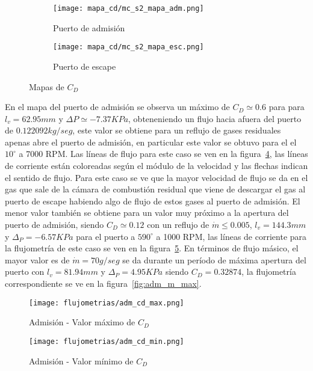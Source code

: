 \begin{figure}[ht!]
    \centering
    \begin{subfigure}{0.7\textwidth}
        \centering
        \texttt{[image: mapa\_cd/mc\_s2\_mapa\_adm.png]}
        \caption{Puerto de admisión}\label{fig:mapa_cd_admisión}
    \end{subfigure}
    \hfill
    \begin{subfigure}{0.7\textwidth}
        \centering
        \texttt{[image: mapa\_cd/mc\_s2\_mapa\_esc.png]}
        \caption{Puerto de escape}\label{fig:mapa_cd_escape}
    \end{subfigure}
    \caption{Mapas de $C_{D}$}\label{fig:mapa_cd_mc_s2}
\end{figure}

En el mapa del puerto de admisión se observa un máximo de $C_{D}\simeq 0.6$ para
para $l_{v}=62.95 mm$ y $\Delta P\simeq -7.37 KPa$, obteneniendo un flujo hacia
afuera del puerto de $0.122092 kg/seg$, este valor se obtiene para un
reflujo de gases residuales apenas abre el puerto de admisión, en particular
este valor se obtuvo para el el $10^{\circ}$ a 7000 RPM.
%
Las líneas de flujo para este caso se ven en la figura~\ref{fig:adm_cd_max}, las
líneas de corriente están coloreadas según el módulo de la velocidad y las
flechas indican el sentido de flujo.
%
Para este caso se ve que la mayor velocidad de flujo se da en el gas que sale de
la cámara de combustión residual que viene de descargar el gas al puerto de
escape habiendo algo de flujo de estos gases al puerto de admisión.
%
El menor valor también se obtiene para un valor muy próximo a la apertura del
puerto de admisión, siendo $C_{D}\simeq 0.12$ con un reflujo de
$\dot{m}\le 0.005$, $l_{v}=144.3 mm$ y $\Delta_{P}=-6.57 KPa$ para el puerto a
$590^{\circ}$ a 1000 RPM, las líneas de corriente para la flujometría de este
caso se ven en la figura~\ref{fig:adm_cd_min}.
%
En términos de flujo másico, el mayor valor  es de $\dot{m}=70 g/seg$ se da
durante un período de máxima apertura del puerto con $l_{v}=81.94 mm$ y
$\Delta_{P}=4.95 KPa$ siendo $C_{D}=0.32874$, la flujometría correspondiente se
ve en la figura~\ref{fig:adm_m_max}.


\begin{figure}[ht]
    \centering
    \texttt{[image: flujometrias/adm\_cd\_max.png]}
    \caption{Admisión - Valor máximo de $C_{D}$}\label{fig:adm_cd_max}
\end{figure}

\begin{figure}[ht]
    \centering
    \texttt{[image: flujometrias/adm\_cd\_min.png]}
    \caption{Admisión - Valor mínimo de $C_{D}$}\label{fig:adm_cd_min}
\end{figure}

